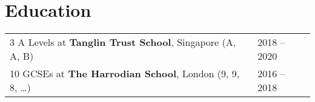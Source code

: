 \documentclass[a4paper,12pt]{article}
\begin{document}
\section{Education}
\begin{tabularx}{\linewidth}{@{}l X@{}}

    3 A Levels at \textbf{Tanglin Trust School}, Singapore (A, A, B)    & \hfill 2018 -- 2020 \\
    10 GCSEs at \textbf{The Harrodian School}, London (9, 9, 8, \ldots) & \hfill 2016 -- 2018 \\
\end{tabularx}

\end{document}
